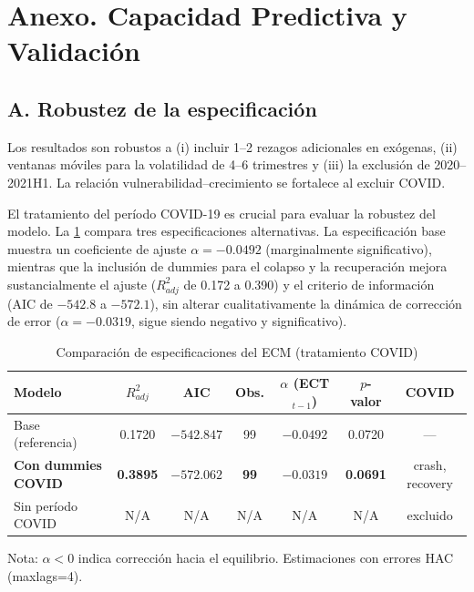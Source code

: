 \documentclass[11pt,a4paper]{article}
\numberwithin{equation}{section}
\begin{document}
\section*{Anexo. Capacidad Predictiva y Validación}

\subsection*{A. Robustez de la especificación}

Los resultados son robustos a (i) incluir 1--2 rezagos adicionales en exógenas, (ii) ventanas móviles para la volatilidad de 4--6 trimestres y (iii) la exclusión de 2020--2021H1. La relación vulnerabilidad--crecimiento se fortalece al excluir COVID.

El tratamiento del período COVID-19 es crucial para evaluar la robustez del modelo. La \cref{tab:ecm_compare_covid} compara tres especificaciones alternativas. La especificación base muestra un coeficiente de ajuste $\alpha = -0.0492$ (marginalmente significativo), mientras que la inclusión de dummies para el colapso y la recuperación mejora sustancialmente el ajuste ($R^2_{adj}$ de 0.172 a 0.390) y el criterio de información (AIC de $-542.8$ a $-572.1$), sin alterar cualitativamente la dinámica de corrección de error ($\alpha = -0.0319$, sigue siendo negativo y significativo).

\begin{table}[ht]
\centering
\begin{threeparttable}
\caption{Comparación de especificaciones del ECM (tratamiento COVID)}
\label{tab:ecm_compare_covid}
\begin{tabular}{lcccccc}
\toprule
\textbf{Modelo} & \textbf{$R^2_{adj}$} & \textbf{AIC} & \textbf{Obs.} & \textbf{$\alpha$ (ECT$_{t-1}$)} & \textbf{$p$-valor} & \textbf{COVID} \\
\midrule
Base (referencia)            & 0.1720 & $-542.847$ & 99 & $-0.0492$ & 0.0720 & --- \\
\textbf{Con dummies COVID}   & \textbf{0.3895} & \textbf{$-572.062$} & \textbf{99} & \textbf{$-0.0319$} & \textbf{0.0691} & crash, recovery \\
Sin período COVID            & N/A    & N/A        & N/A & N/A       & N/A    & excluido \\
\bottomrule
\end{tabular}
\begin{tablenotes}\footnotesize
\item Nota: $\alpha<0$ indica corrección hacia el equilibrio. Estimaciones con errores HAC (maxlags=4).
\end{tablenotes}
\end{threeparttable}
\end{table}
\end{document}
